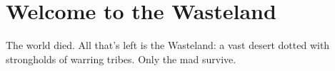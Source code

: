 
\section{Welcome to the Wasteland}
The world died. All that's left is the Wasteland: a vast desert dotted with strongholds of warring tribes. Only the mad survive.
